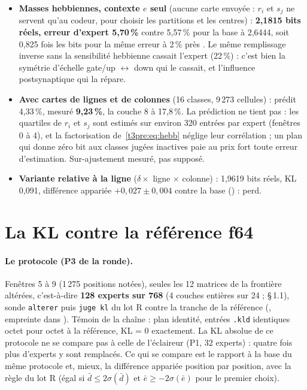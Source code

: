 \begin{itemize}
\item \textbf{Masses hebbiennes, contexte $e$ seul} (aucune carte envoyée : $r_i$ et $s_j$ ne servent qu'au codeur, pour choisir les partitions et les centres) : \textbf{2,1815 bits réels, erreur d'expert 5,70\,\%} contre 5,57\,\% pour la base à 2,6444, soit 0,825 fois les bits pour la même erreur à 2\,\% près \mes. Le même remplissage inverse sans la sensibilité hebbienne cassait l'expert (22\,\%) : c'est bien la symétrie d'échelle gate/up $\leftrightarrow$ down qui le cassait, et l'influence postsynaptique qui la répare.
\item \textbf{Avec cartes de lignes et de colonnes} (16 classes, 9\,273 cellules) : prédit 4,33\,\%, mesuré \textbf{9,23\,\%}, la couche 8 à 17,8\,\%. La prédiction ne tient pas : les quartiles de $r_i$ et $s_j$ sont estimés sur environ 320 entrées par expert (fenêtres 0 à 4), et la factorisation de~\eqref{t3pre:eq:hebb} néglige leur corrélation ; un plan qui donne zéro bit aux classes jugées inactives paie au prix fort toute erreur d'estimation. Sur-ajustement mesuré, pas supposé.
\item \textbf{Variante relative à la ligne} ($\delta \times$ ligne $\times$ colonne) : 1,9619 bits réels, KL 0,091, différence appariée $+0{,}027 \pm 0{,}004$ contre la base () : perd.
\end{itemize}

\section{La KL contre la référence f64}\label{t3pre:sec:kl}

\paragraph{Le protocole (P3 de la ronde).} Fenêtres 5 à 9 (1\,275 positions notées), seules les 12 matrices de la frontière altérées, c'est-à-dire \textbf{128 experts sur 768} (4 couches entières sur 24 ;  §\,1.1), sonde \texttt{alterer} puis \texttt{juge kl} du lot R contre la tranche de la référence (, empreinte dans ). Témoin de la chaîne : plan identité, entrées \texttt{.kld} identiques octet pour octet à la référence, KL = 0 exactement. La KL absolue de ce protocole ne se compare pas à celle de l'éclaireur (P1, 32 experts) : quatre fois plus d'experts y sont remplacés. Ce qui se compare est le rapport à la base du même protocole et, mieux, la différence appariée position par position, avec la règle du lot R (égal si $\bar d \le 2\sigma(\bar d)$ et $\bar e \ge -2\sigma(\bar e)$ pour le premier choix).

